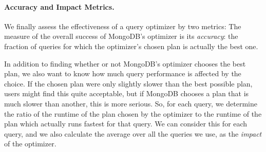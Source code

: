 \paragraph{\textbf{Accuracy and Impact Metrics.}}
We finally assess the effectiveness of a query optimizer by two metrics: 
The measure of the overall success of MongoDB's optimizer is its \emph{accuracy}: the fraction of queries for which the optimizer's chosen plan is actually the best one.

In addition to finding whether or not MongoDB's \approachName optimizer chooses the best plan, we also want to know how much query performance is affected by the choice. If the chosen plan were only slightly slower than the best possible plan, users might find this quite acceptable, but if MongoDB chooses a plan that is much slower than another, this is more serious. So, for each query, we determine the ratio of the runtime of the plan chosen by the optimizer to the runtime of the plan which actually runs fastest for that query. We can consider this for each query, and we also calculate the average over all the queries we use, as the \emph{impact} of the optimizer.




